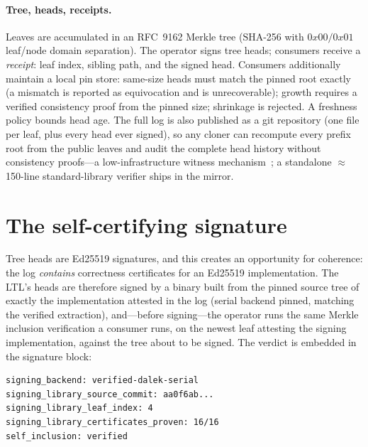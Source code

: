 \documentclass[10pt,twocolumn]{article}
\begin{document}
\paragraph{Tree, heads, receipts.} Leaves are accumulated in an
RFC~9162 Merkle tree ($\mathrm{SHA}$-256 with $0x00/0x01$
leaf/node domain separation). The operator signs tree heads; consumers
receive a \emph{receipt}: leaf index, sibling path, and the signed head.
Consumers additionally maintain a local pin store: same-size heads must
match the pinned root exactly (a mismatch is reported as equivocation
and is unrecoverable); growth requires a verified consistency proof from
the pinned size; shrinkage is rejected. A freshness policy bounds head
age. The full log is also published as a git repository (one file per
leaf, plus every head ever signed), so any cloner can recompute every
prefix root from the public leaves and audit the complete head history
without consistency proofs---a low-infrastructure witness
mechanism~\cite{rfc9162}; a standalone $\approx$150-line
standard-library verifier ships in the mirror.

\section{The self-certifying signature}
\label{sec:dogfood}

Tree heads are Ed25519 signatures, and this creates an opportunity for
coherence: the log \emph{contains} correctness certificates for an
Ed25519 implementation. The LTL's heads are therefore signed by a binary
built from the pinned source tree of exactly the implementation attested
in the log (serial backend pinned, matching the verified extraction),
and---before signing---the operator runs the same Merkle inclusion
verification a consumer runs, on the newest leaf attesting the signing
implementation, against the tree about to be signed. The verdict is
embedded in the signature block:

{\small
\begin{verbatim}
signing_backend: verified-dalek-serial
signing_library_source_commit: aa0f6ab...
signing_library_leaf_index: 4
signing_library_certificates_proven: 16/16
self_inclusion: verified
\end{verbatim}}
\end{document}
